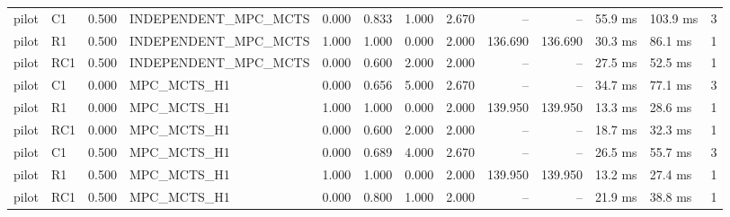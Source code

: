 \begin{table}
{\begin{tabular}{llrlrrrrrrllr}
pilot & C1 & 0.500 & INDEPENDENT\_MPC\_MCTS & 0.000 & 0.833 & 1.000 & 2.670 & -- & -- & 55.9 ms & 103.9 ms & 3 \\
pilot & R1 & 0.500 & INDEPENDENT\_MPC\_MCTS & 1.000 & 1.000 & 0.000 & 2.000 & 136.690 & 136.690 & 30.3 ms & 86.1 ms & 1 \\
pilot & RC1 & 0.500 & INDEPENDENT\_MPC\_MCTS & 0.000 & 0.600 & 2.000 & 2.000 & -- & -- & 27.5 ms & 52.5 ms & 1 \\
pilot & C1 & 0.000 & MPC\_MCTS\_H1 & 0.000 & 0.656 & 5.000 & 2.670 & -- & -- & 34.7 ms & 77.1 ms & 3 \\
pilot & R1 & 0.000 & MPC\_MCTS\_H1 & 1.000 & 1.000 & 0.000 & 2.000 & 139.950 & 139.950 & 13.3 ms & 28.6 ms & 1 \\
pilot & RC1 & 0.000 & MPC\_MCTS\_H1 & 0.000 & 0.600 & 2.000 & 2.000 & -- & -- & 18.7 ms & 32.3 ms & 1 \\
pilot & C1 & 0.500 & MPC\_MCTS\_H1 & 0.000 & 0.689 & 4.000 & 2.670 & -- & -- & 26.5 ms & 55.7 ms & 3 \\
pilot & R1 & 0.500 & MPC\_MCTS\_H1 & 1.000 & 1.000 & 0.000 & 2.000 & 139.950 & 139.950 & 13.2 ms & 27.4 ms & 1 \\
pilot & RC1 & 0.500 & MPC\_MCTS\_H1 & 0.000 & 0.800 & 1.000 & 2.000 & -- & -- & 21.9 ms & 38.8 ms & 1 \\
\bottomrule
\end{tabular}
}
\end{table}
